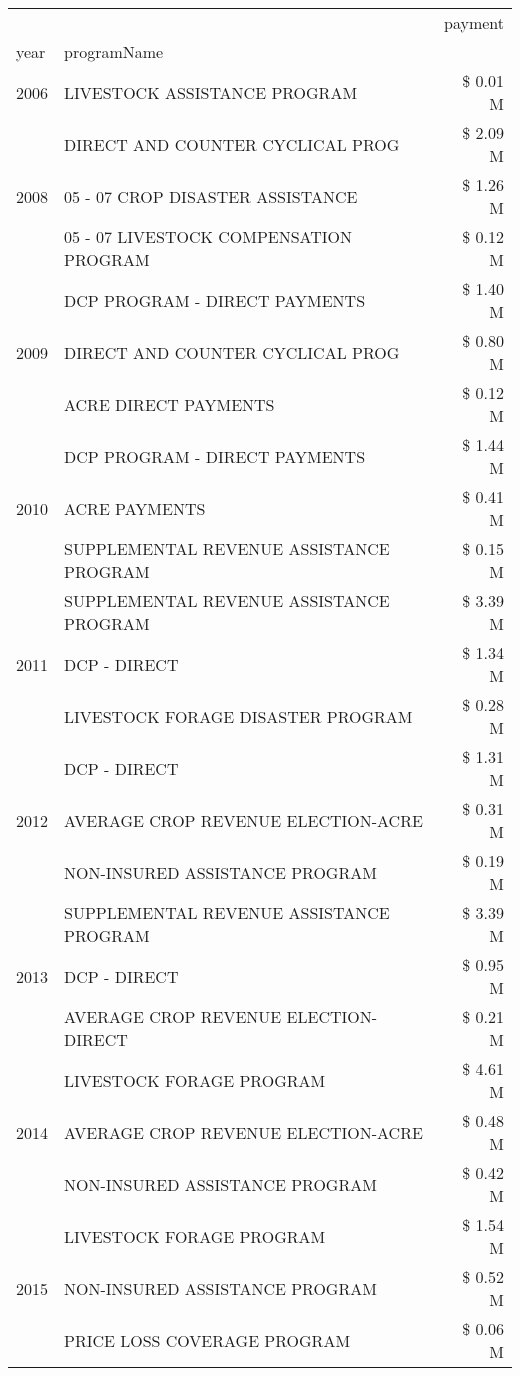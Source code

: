 \begin{tabular}{llr}
\toprule
 &  & payment \\
year & programName &  \\
\midrule
2006 & LIVESTOCK ASSISTANCE PROGRAM & \$ 0.01 M \\
\cline{1-3}
\multirow[t]{3}{*}{2008} & DIRECT AND COUNTER CYCLICAL PROG & \$ 2.09 M \\
 & 05 - 07 CROP DISASTER ASSISTANCE & \$ 1.26 M \\
 & 05 - 07 LIVESTOCK COMPENSATION PROGRAM & \$ 0.12 M \\
\cline{1-3}
\multirow[t]{3}{*}{2009} & DCP PROGRAM - DIRECT PAYMENTS & \$ 1.40 M \\
 & DIRECT AND COUNTER CYCLICAL PROG & \$ 0.80 M \\
 & ACRE DIRECT PAYMENTS & \$ 0.12 M \\
\cline{1-3}
\multirow[t]{3}{*}{2010} & DCP PROGRAM - DIRECT PAYMENTS & \$ 1.44 M \\
 & ACRE PAYMENTS & \$ 0.41 M \\
 & SUPPLEMENTAL REVENUE ASSISTANCE PROGRAM & \$ 0.15 M \\
\cline{1-3}
\multirow[t]{3}{*}{2011} & SUPPLEMENTAL REVENUE ASSISTANCE PROGRAM & \$ 3.39 M \\
 & DCP - DIRECT & \$ 1.34 M \\
 & LIVESTOCK FORAGE DISASTER PROGRAM & \$ 0.28 M \\
\cline{1-3}
\multirow[t]{3}{*}{2012} & DCP - DIRECT & \$ 1.31 M \\
 & AVERAGE CROP REVENUE ELECTION-ACRE & \$ 0.31 M \\
 & NON-INSURED ASSISTANCE PROGRAM & \$ 0.19 M \\
\cline{1-3}
\multirow[t]{3}{*}{2013} & SUPPLEMENTAL REVENUE ASSISTANCE PROGRAM & \$ 3.39 M \\
 & DCP - DIRECT & \$ 0.95 M \\
 & AVERAGE CROP REVENUE ELECTION-DIRECT & \$ 0.21 M \\
\cline{1-3}
\multirow[t]{3}{*}{2014} & LIVESTOCK FORAGE PROGRAM & \$ 4.61 M \\
 & AVERAGE CROP REVENUE ELECTION-ACRE & \$ 0.48 M \\
 & NON-INSURED ASSISTANCE PROGRAM & \$ 0.42 M \\
\cline{1-3}
\multirow[t]{3}{*}{2015} & LIVESTOCK FORAGE PROGRAM & \$ 1.54 M \\
 & NON-INSURED ASSISTANCE PROGRAM & \$ 0.52 M \\
 & PRICE LOSS COVERAGE PROGRAM & \$ 0.06 M \\

\end{tabular}
